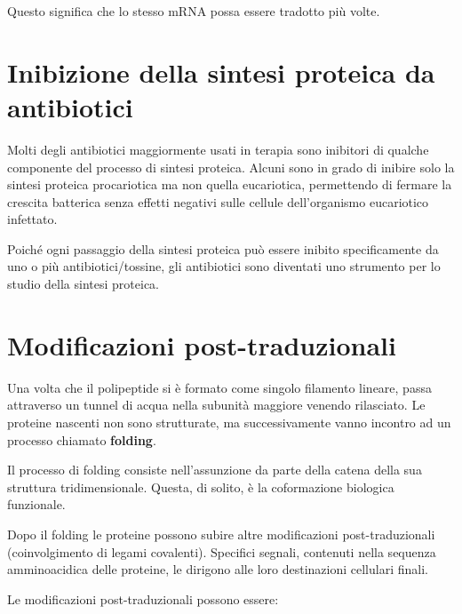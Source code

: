 \documentclass[11pt]{book}
\begin{document}
Questo significa che lo stesso mRNA possa essere tradotto più volte.

\section{Inibizione della sintesi proteica da
antibiotici}\label{inibizione-della-sintesi-proteica-da-antibiotici}

Molti degli antibiotici maggiormente usati in terapia sono inibitori di
qualche componente del processo di sintesi proteica. Alcuni sono in
grado di inibire solo la sintesi proteica procariotica ma non quella
eucariotica, permettendo di fermare la crescita batterica senza effetti
negativi sulle cellule dell'organismo eucariotico infettato.

Poiché ogni passaggio della sintesi proteica può essere inibito
specificamente da uno o più antibiotici/tossine, gli antibiotici sono
diventati uno strumento per lo studio della sintesi proteica.

\section{Modificazioni
post-traduzionali}\label{modificazioni-post-traduzionali}

Una volta che il polipeptide si è formato come singolo filamento
lineare, passa attraverso un tunnel di acqua nella subunità maggiore
venendo rilasciato. Le proteine nascenti non sono strutturate, ma
successivamente vanno incontro ad un processo chiamato \textbf{folding}.

Il processo di folding consiste nell'assunzione da parte della catena
della sua struttura tridimensionale. Questa, di solito, è la
coformazione biologica funzionale.

Dopo il folding le proteine possono subire altre modificazioni
post-traduzionali (coinvolgimento di legami covalenti). Specifici
segnali, contenuti nella sequenza amminoacidica delle proteine, le
dirigono alle loro destinazioni cellulari finali.

Le modificazioni post-traduzionali possono essere:
\end{document}
